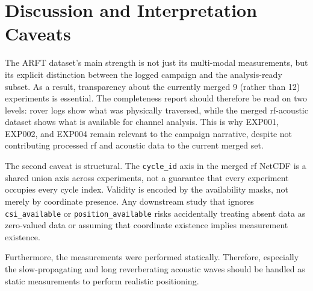 \section{Discussion and Interpretation Caveats}
\label{sec:discussion}

The ARFT dataset's main strength is not just its multi-modal measurements, but its explicit distinction between the logged campaign and the analysis-ready subset. As a result, transparency about the currently merged 9 (rather than 12) experiments is essential. The completeness report should therefore be read on two levels: rover logs show what was physically traversed, while the merged \gls{rf}-acoustic dataset shows what is available for channel analysis. This is why EXP001, EXP002, and EXP004 remain relevant to the campaign narrative, despite not contributing processed \gls{rf} and acoustic data to the current merged set.

The second caveat is structural. The \texttt{cycle\_id} axis in the merged \gls{rf} NetCDF is a shared union axis across experiments, not a guarantee that every experiment occupies every cycle index. Validity is encoded by the availability masks, not merely by coordinate presence. Any downstream study that ignores \texttt{csi\_available} or \texttt{position\_available} risks accidentally treating absent data as zero-valued data or assuming that coordinate existence implies measurement existence.

Furthermore, the measurements were performed statically. Therefore, especially the slow-propagating and long reverberating acoustic waves should be handled as static measurements to perform realistic positioning.
